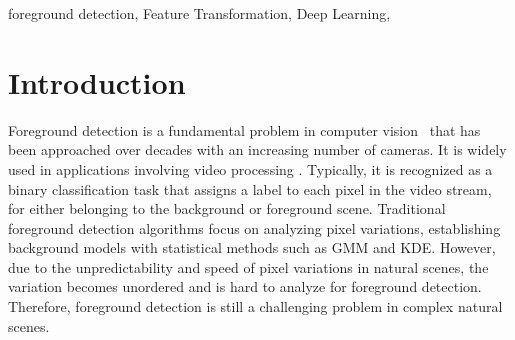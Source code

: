 \documentclass[journal]{IEEEtran}
\begin{document}
\begin{IEEEkeywords} 
    foreground detection, Feature Transformation, Deep Learning,
\end{IEEEkeywords}

\IEEEpeerreviewmaketitle

\section{Introduction}
Foreground detection is a fundamental problem in computer vision\ \cite{Bouwmans201431} that has been approached over decades with an increasing number of cameras.
It is widely used in applications involving video processing \cite{Barnich2011_2011_TIP}.
Typically, it is recognized as a binary classification task that assigns a label to each pixel in the video stream,
for either belonging to the background or foreground scene.
Traditional foreground detection algorithms focus on analyzing pixel variations, establishing background models with statistical methods such as GMM\cite{Stauffer1999}\cite{lee2005} and KDE\cite{Elgammal2000Non}\cite{Mittal2004KDE}.
However, due to the unpredictability and speed of pixel variations in natural scenes,
the variation becomes unordered and is hard to analyze for foreground detection.
Therefore, foreground detection is still a challenging problem in complex natural scenes.
%
%

\end{document}

